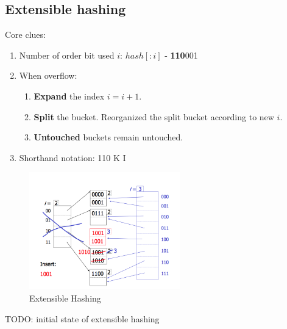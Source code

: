 \documentclass[a4paper]{report}
\begin{document}
\subsection{Extensible hashing}
Core clues:
\begin{enumerate}
\item Number of  order bit used $i$: $hash[:i]$ - \textbf{110}001
\item When overflow:
  \begin{enumerate}
  \item \textbf{Expand} the index $i=i+1$.
  \item \textbf{Split} the bucket. Reorganized the split bucket according to new $i$.
  \item \textbf{Untouched} buckets remain untouched. 
  \end{enumerate}
\item Shorthand notation: 110  K I
\end{enumerate}
\begin{figure}[H]
        \centerline{\includegraphics[height = 2in]{img/extensible_hashing}}
        \caption{Extensible Hashing}
    \label{fig:extensibleHashing}
\end{figure}
TODO: initial state of extensible hashing 
\end{document}
